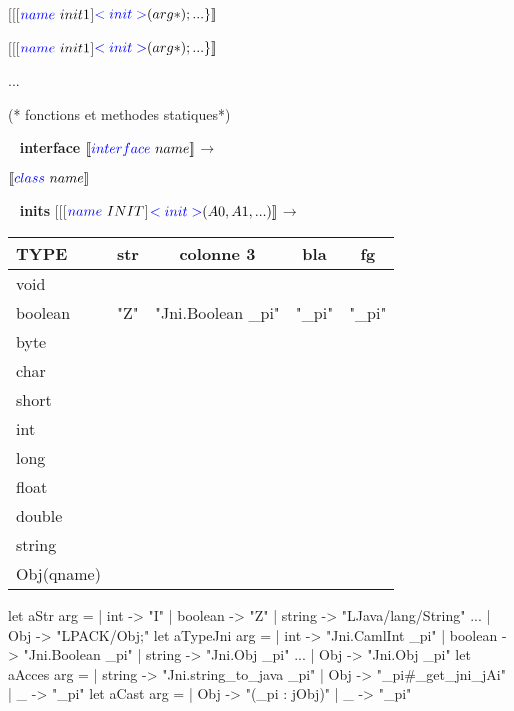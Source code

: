 \documentclass[a4paper, 11pt]{report}
\begin{document}
$[\![$[$ {\color{blue}name}\ init1 $]${\color{blue} <init>} (arg*); ...\}
]\!]$

$[\![$[$ {\color{blue}name}\ init1 $]${\color{blue} <init>} (arg*); ...\}
]\!]$

...
\begin{OCaml}
(* fonctions et  methodes statiques*)


\end{OCaml}

\newpage
\
\newline
\textbf{ interface }
\newline
\noindent
$[\![{\color{blue}interface}\  name ]\!]$$\longrightarrow$
% 

$[\![{\color{blue}class}\  name ]\!]_{}$

\ 
\newline
\noindent
\textbf{ inits }
\newline
\noindent
$[\![$[$ {\color{blue}name}\ INIT $]${\color{blue} <init>} (A0,
    A1, ...)]\!]_{}$$\longrightarrow$
% 


\begin{tabular}{|l|c|c|c|c|}
  \hline
  TYPE & str & colonne 3 & bla& fg\\
  \hline
  void & & & & \\
  boolean & "Z" & "Jni.Boolean \_pi" & "\_pi" & "\_pi" \\
  byte & & & & \\
  char  & & & &\\
  short & & && \\
  int & & && \\
  long & & & &\\
  float & & & &\\
  double & & & &\\
  string & & & &\\
  Obj(qname) & & & &\\
  \hline
\end{tabular}

\begin{OCaml}

let aStr arg =
   | int -> "I"
   | boolean -> "Z"
   | string -> "LJava/lang/String"
     ...
   | Obj -> "LPACK/Obj;"
let aTypeJni arg =
   | int -> "Jni.CamlInt _pi"
   | boolean -> "Jni.Boolean _pi"
   | string -> "Jni.Obj _pi"
     ...
   | Obj -> "Jni.Obj _pi"
let aAcces arg =
  | string -> "Jni.string_to_java _pi"
  | Obj -> "_pi#_get_jni_jAi"
  |  _ -> "_pi"
let aCast arg =
  | Obj -> "(_pi : jObj)"
  |  _ -> "_pi"

\end{OCaml}
\end{document}
